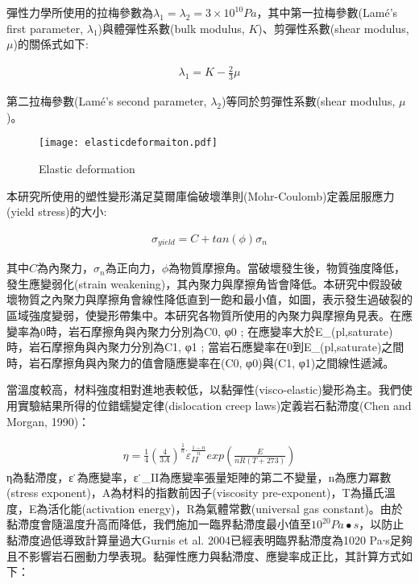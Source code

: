 彈性力學所使用的拉梅參數為$\lambda_1 = \lambda_2 = 3 \times 10^{10} Pa$，其中第一拉梅參數(Lamé's first parameter, $\lambda_1$)與體彈性系數(bulk modulus, $K$)、剪彈性系數(shear modulus, $\mu$)的關係式如下:

\begin{align}
\lambda_1 = K - \frac{2}{3}\mu
\end{align}

第二拉梅參數(Lamé's second parameter, $\lambda_2$)等同於剪彈性系數(shear modulus, $\mu$)。

\begin{figure*}[ht!]
    \centering
    \texttt{[image: elasticdeformaiton.pdf]}
    \caption{ Elastic deformation }
    \label{fig::elastic}
\end{figure*}

本研究所使用的塑性變形滿足莫爾庫倫破壞準則(Mohr-Coulomb)定義屈服應力(yield stress)的大小:

\begin{align}
    σ_{yield}=C+tan(\phi)\sigma_n \label{eqn:elastic tensor}
\end{align}

其中$C$為內聚力，$\sigma_n$為正向力，$\phi$為物質摩擦角。當破壞發生後，物質強度降低，發生應變弱化(strain weakening)，其內聚力與摩擦角皆會降低。本研究中假設破壞物質之內聚力與摩擦角會線性降低直到一飽和最小值，如圖，表示發生過破裂的區域強度變弱，使變形帶集中。本研究各物質所使用的內聚力與摩擦角見表。在應變率為0時，岩石摩擦角與內聚力分別為C0, φ0 ; 在應變率大於E_(pl,saturate)時，岩石摩擦角與內聚力分別為C1, φ1 ; 當岩石應變率在0到E_(pl,saturate)之間時，岩石摩擦角與內聚力的值會隨應變率在(C0, φ0)與(C1, φ1)之間線性遞減。


當溫度較高，材料強度相對進地表較低，以黏彈性(visco-elastic)變形為主。我們使用實驗結果所得的位錯蠕變定律(dislocation creep laws)定義岩石黏滯度(Chen and Morgan, 1990)：

\begin{align}
   \eta=\frac{1}{4}(\frac{4}{3A})^{\frac{1}{n}} \dot\varepsilon_{II}^{\frac{1-n}{n}} exp(\frac{E}{nR(T+273)})
   \label{eqn:viscousity}
\end{align}
η為黏滯度，ε ̇為應變率，ε ̇_II為應變率張量矩陣的第二不變量，n為應力冪數(stress exponent)，A為材料的指數前因子(viscosity pre-exponent)，T為攝氏溫度，E為活化能(activation energy)，R為氣體常數(universal gas constant)。由於黏滯度會隨溫度升高而降低，我們施加一臨界黏滯度最小值至$10^20 Pa∙s$，以防止黏滯度過低導致計算量過大Gurnis et al. 2004已經表明臨界黏滯度為1020 Pa∙s足夠且不影響岩石圈動力學表現。黏彈性應力與黏滯度、應變率成正比，其計算方式如下：	

